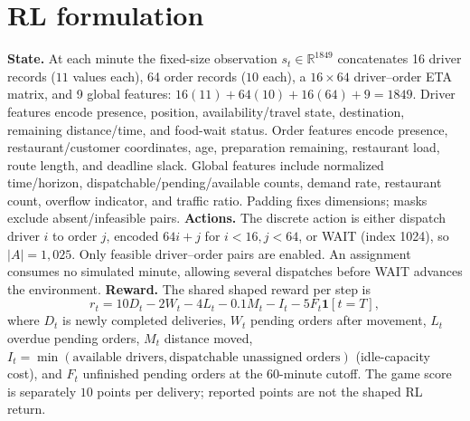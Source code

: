 \documentclass[9pt,twocolumn]{article}
\begin{document}
\section{RL formulation}
\textbf{State.} At each minute the fixed-size observation $s_t\in\mathbb{R}^{1849}$ concatenates 16 driver records ($11$ values each), 64 order records ($10$ each), a $16\times64$ driver--order ETA matrix, and 9 global features: $16(11)+64(10)+16(64)+9=1849$. Driver features encode presence, position, availability/travel state, destination, remaining distance/time, and food-wait status. Order features encode presence, restaurant/customer coordinates, age, preparation remaining, restaurant load, route length, and deadline slack. Global features include normalized time/horizon, dispatchable/pending/available counts, demand rate, restaurant count, overflow indicator, and traffic ratio. Padding fixes dimensions; masks exclude absent/infeasible pairs.
\textbf{Actions.} The discrete action is either dispatch driver $i$ to order $j$, encoded $64i+j$ for $i<16,j<64$, or WAIT (index 1024), so $|A|=1,025$. Only feasible driver--order pairs are enabled. An assignment consumes no simulated minute, allowing several dispatches before WAIT advances the environment.
\textbf{Reward.} The shared shaped reward per step is
\begin{equation*}r_t=10D_t-2W_t-4L_t-0.1M_t-I_t-5F_t\mathbf{1}[t=T],\end{equation*}
where $D_t$ is newly completed deliveries, $W_t$ pending orders after movement, $L_t$ overdue pending orders, $M_t$ distance moved, $I_t=\min(\text{available drivers},\text{dispatchable unassigned orders})$ (idle-capacity cost), and $F_t$ unfinished pending orders at the 60-minute cutoff. The game score is separately $10$ points per delivery; reported points are not the shaped RL return.
\end{document}
